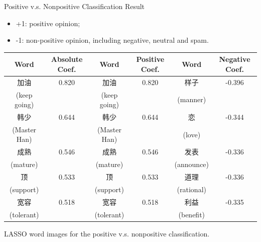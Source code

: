\documentclass[12pt]{beamer}
\newcommand{\1}[1]{{\mathbf 1}\left\{#1\right\}}        %
\begin{document}
\begin{frame}{Positive v.s. Nonpositive Classification Result}

\begin{itemize}[<+->]
\item +1: positive opinion;
\item -1: non-positive opinion, including negative, neutral and spam.
\end{itemize}

\tiny
\begin{center}
\begin{tabular}{|c|c||c|c||c|c|}
\hline
Word & Absolute Coef. & Word & Positive Coef. & Word & Negative Coef.\\ \hline \hline
加油 & 0.820 & 加油 & 0.820 & 样子 & -0.396\\
(keep going) & & (keep going) & & (manner) & \\\hline
韩少 & 0.644 & 韩少 & 0.644 & 恋 & -0.344\\
(Master Han) & & (Master Han) & & (love) & \\\hline
成熟 & 0.546 & 成熟 & 0.546 & 发表 & -0.336\\
(mature) & & (mature) & & (announce) & \\\hline
顶 & 0.533 & 顶 & 0.533 & 道理 & -0.336\\
(support) & & (support) & & (rational) & \\\hline
宽容 & 0.518 & 宽容 & 0.518 & 利益 & -0.335\\
(tolerant) & & (tolerant) & & (benefit) & \\\hline
\end{tabular}
LASSO word images for the positive v.s. nonpositive classification.
\end{center}


\end{frame}
\end{document}

